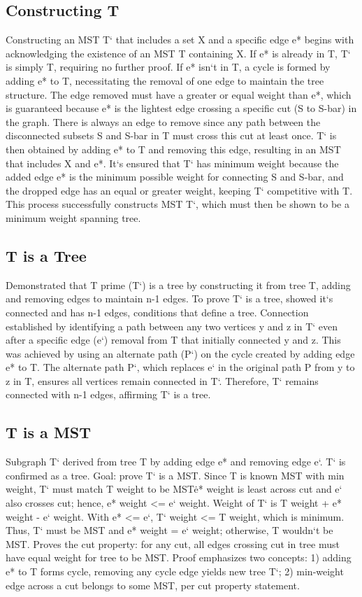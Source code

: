 \subsection*{Constructing T}
Constructing an MST T` that includes a set X and a specific edge e* begins with acknowledging the existence of an MST T containing X\@.
If e* is already in T, T` is simply T, requiring no further proof.
If e* isn`t in T, a cycle is formed by adding e* to T, necessitating the removal of one edge to maintain the tree structure.
The edge removed must have a greater or equal weight than e*, which is guaranteed because e* is the lightest edge crossing a specific cut (S to S-bar) in the graph.
There is always an edge to remove since any path between the disconnected subsets S and S-bar in T must cross this cut at least once.
T` is then obtained by adding e* to T and removing this edge, resulting in an MST that includes X and e*.
It`s ensured that T` has minimum weight because the added edge e* is the minimum possible weight for connecting S and S-bar, and the dropped edge has an equal or greater weight, keeping T` competitive with T\@.
This process successfully constructs MST T`, which must then be shown to be a minimum weight spanning tree.

\subsection*{T is a Tree}
Demonstrated that T prime (T`) is a tree by constructing it from tree T, adding and removing edges to maintain n-1 edges.
To prove T` is a tree, showed it`s connected and has n-1 edges, conditions that define a tree.
Connection established by identifying a path between any two vertices y and z in T` even after a specific edge (e`) removal from T that initially connected y and z.
This was achieved by using an alternate path (P`) on the cycle created by adding edge e* to T\@.
The alternate path P`, which replaces e` in the original path P from y to z in T, ensures all vertices remain connected in T`.
Therefore, T` remains connected with n-1 edges, affirming T` is a tree.

\subsection*{T is a MST}
Subgraph T` derived from tree T by adding edge e* and removing edge e`.
T` is confirmed as a tree.
Goal: prove T` is a MST\@.
Since T is known MST with min weight, T` must match T weight to be MST\@\. e* weight is least across cut and e` also crosses cut; hence, e* weight \textless{}= e` weight.
Weight of T` is T weight + e* weight - e` weight.
With e* \textless{}= e`, T` weight \textless{}= T weight, which is minimum.
Thus, T` must be MST and e* weight = e` weight; otherwise, T wouldn`t be MST\@.
Proves the cut property: for any cut, all edges crossing cut in tree must have equal weight for tree to be MST\@.
Proof emphasizes two concepts: 1) adding e* to T forms cycle, removing any cycle edge yields new tree T`; 2) min-weight edge across a cut belongs to some MST, per cut property statement.


